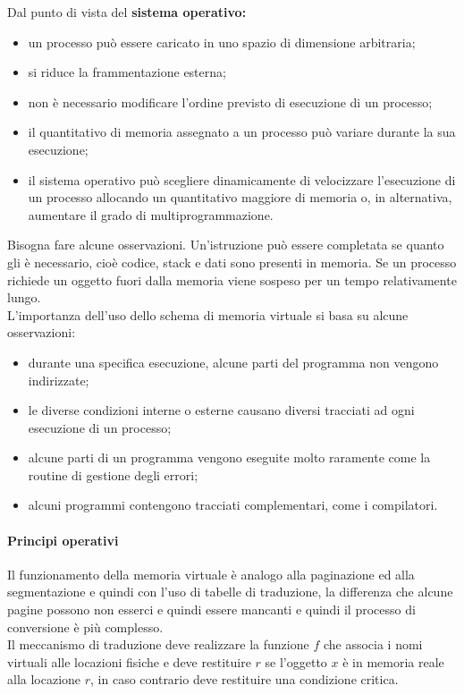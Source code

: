 \documentclass[12pt, letterpaper]{report}
\begin{document}
	Dal punto di vista del \textbf{sistema operativo:}
	\begin{itemize}
		\item un processo può essere caricato in uno spazio di dimensione arbitraria;
		\item si riduce la frammentazione esterna;
		\item non è necessario modificare l'ordine previsto di esecuzione di un processo;
		\item il quantitativo di memoria assegnato a un processo può variare durante la sua esecuzione;
		\item il sistema operativo può scegliere dinamicamente di velocizzare l'esecuzione di un processo allocando un quantitativo maggiore di memoria o, in alternativa, aumentare il grado di multiprogrammazione.
	\end{itemize}
	Bisogna fare alcune osservazioni. Un'istruzione può essere completata se quanto gli è necessario, cioè codice, stack e dati sono presenti in memoria. Se un processo richiede un oggetto fuori dalla memoria viene sospeso per un tempo relativamente lungo. \\
	L'importanza dell'uso dello schema di memoria virtuale si basa su alcune osservazioni:
	\begin{itemize}
		\item durante una specifica esecuzione, alcune parti del programma non vengono indirizzate;
		\item le diverse condizioni interne o esterne causano diversi tracciati ad ogni esecuzione di un processo;
		\item alcune parti di un programma vengono eseguite molto raramente come la routine di gestione degli errori;
		\item alcuni programmi contengono tracciati complementari, come i compilatori.
	\end{itemize}
	\paragraph{Principi operativi}
	Il funzionamento della memoria virtuale è analogo alla paginazione ed alla segmentazione e quindi con l'uso di tabelle di traduzione, la differenza  che alcune pagine possono non esserci e quindi essere mancanti e quindi il processo di conversione è più complesso. \\
	Il meccanismo di traduzione deve realizzare la funzione $f$ che associa i nomi virtuali alle locazioni fisiche e deve restituire $r$ se l'oggetto $x$ è in memoria reale alla locazione $r$, in caso contrario deve restituire una condizione critica.
\end{document}
